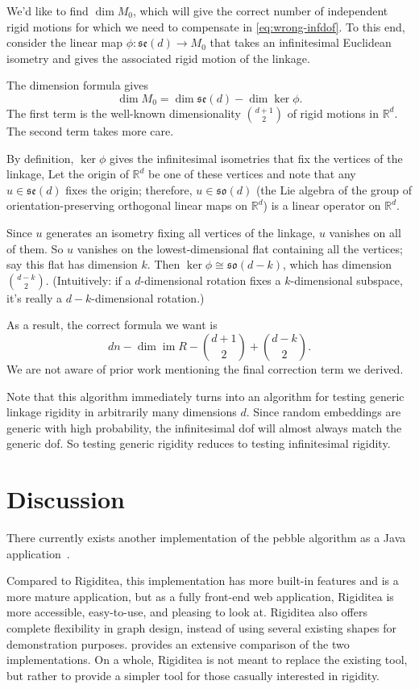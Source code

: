 \documentclass[aps,prd,final,twocolumn,letterpaper,nofootinbib]{revtex4-1}
\newcommand\RR{\mathbb{R}}
\DeclareMathOperator\im{im}
\begin{document}
We'd like to find $\dim M_0$,
which will give the correct number of independent rigid motions
for which we need to compensate in \cref{eq:wrong-infdof}.
To this end,
consider the linear map $\phi\colon\mathfrak{se}(d) \to M_0$
that takes an infinitesimal Euclidean isometry
and gives the associated rigid motion of the linkage.

The dimension formula gives
\[
    \dim M_0 = \dim\mathfrak{se}(d) - \dim\ker\phi.
\]
The first term is the well-known dimensionality $\binom{d+1}{2}$
of rigid motions in $\RR^d$.
The second term takes more care.

By definition, $\ker\phi$ gives the infinitesimal isometries
that fix the vertices of the linkage,
Let the origin of $\RR^d$ be one of these vertices
and note that any $u\in \mathfrak{se}(d)$ fixes the origin;
therefore, $u\in\mathfrak{so}(d)$
(the Lie algebra of the group
of orientation-preserving orthogonal linear maps on $\RR^d$)
is a linear operator on $\RR^d$.

Since $u$ generates an isometry fixing all vertices of the linkage,
$u$ vanishes on all of them.
So $u$ vanishes on the lowest-dimensional flat containing all the vertices;
say this flat has dimension $k$.
Then $\ker\phi\cong\mathfrak{so}(d-k)$, which has dimension $\binom{d-k}{2}$.
(Intuitively: if a $d$-dimensional rotation fixes a $k$-dimensional subspace,
it's really a $d-k$-dimensional rotation.)

As a result, the correct formula we want is
\begin{equation}
    dn - \dim\im R - \binom{d+1}{2} + \binom{d-k}{2}.
\end{equation}
We are not aware of prior work mentioning the final correction term we derived.

Note that this algorithm immediately turns into an algorithm
for testing generic linkage rigidity in arbitrarily many dimensions $d$.
Since random embeddings are generic with high probability,
the infinitesimal dof will almost always match the generic dof.
So testing generic rigidity reduces to testing infinitesimal rigidity.


\section{Discussion}

There currently exists another
implementation of the pebble algorithm as a Java application~\cite{stjohnapplet}.

Compared to Rigiditea, this implementation
has more built-in features and is a more mature application,
but as a fully front-end web application,
Rigiditea is more accessible, easy-to-use, and pleasing to look at.
Rigiditea also offers complete flexibility in graph design,
instead of using several existing shapes for demonstration purposes.
 provides an extensive comparison of the two implementations.
On a whole, Rigiditea is not meant to replace the existing tool,
but rather to provide a simpler tool for those casually interested
in rigidity.
\end{document}
